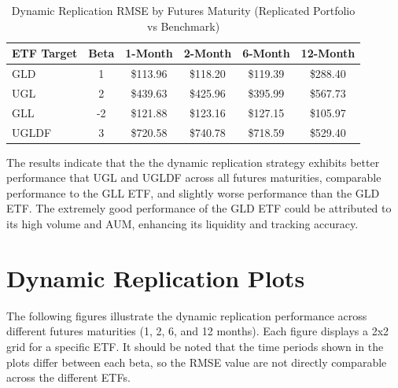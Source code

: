\documentclass{article}
\begin{document}
\begin{table}[h!]
\centering
\caption{Dynamic Replication RMSE by Futures Maturity (Replicated Portfolio vs Benchmark)}
\label{tab:dynamic_rmse}
\begin{tabular}{lccccc}
\toprule
\textbf{ETF Target} & \textbf{Beta} & \textbf{1-Month} & \textbf{2-Month} & \textbf{6-Month} & \textbf{12-Month} \\
\midrule
GLD   & 1  & \$113.96 & \$118.20 & \$119.39 & \$288.40 \\
UGL   & 2  & \$439.63 & \$425.96 & \$395.99 & \$567.73 \\
GLL   & -2 & \$121.88 & \$123.16 & \$127.15 & \$105.97 \\
UGLDF & 3  & \$720.58 & \$740.78 & \$718.59 & \$529.40 \\
\bottomrule
\end{tabular}
\end{table}

The results indicate that the the dynamic replication strategy exhibits better performance that UGL and UGLDF across all futures maturities,
comparable performance to the GLL ETF, and slightly worse performance than the GLD ETF.
The extremely good performance of the GLD ETF could be attributed to its high volume and AUM, enhancing its liquidity and tracking accuracy.


\newpage
\section{Dynamic Replication Plots}

The following figures illustrate the dynamic replication performance across different futures maturities (1, 2, 6, and 12 months). Each figure displays a 2x2 grid for a specific ETF. 
It should be noted that the time periods shown in the plots differ between each beta, 
so the RMSE value are not directly comparable across the different ETFs.
\end{document}
